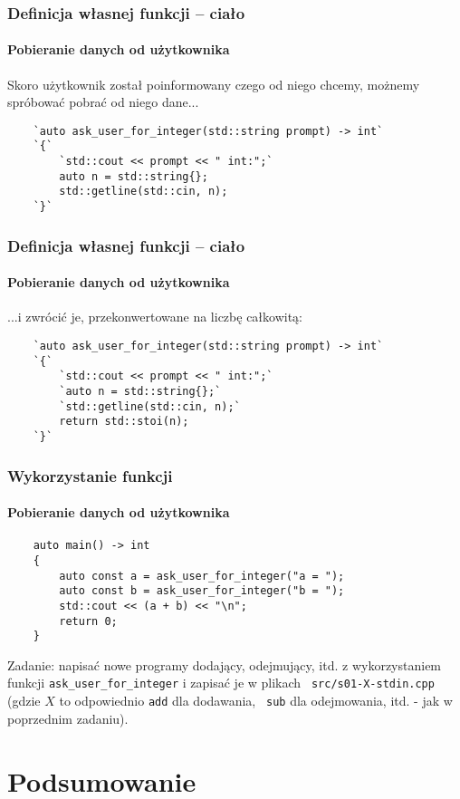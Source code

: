 \documentclass[aspectratio=169]{beamer}
\begin{document}
\begin{frame}[fragile]
    \frametitle{Definicja własnej funkcji -- ciało}
    \framesubtitle{Pobieranie danych od użytkownika}

    Skoro użytkownik został poinformowany czego od niego chcemy, możnemy
    spróbować pobrać od niego dane...

    {\scriptsize
    \begin{lstlisting}
    `auto ask_user_for_integer(std::string prompt) -> int`
    `{`
        `std::cout << prompt << " int:";`
        auto n = std::string{};
        std::getline(std::cin, n);
    `}`
    \end{lstlisting}}
\end{frame}

\begin{frame}[fragile]
    \frametitle{Definicja własnej funkcji -- ciało}
    \framesubtitle{Pobieranie danych od użytkownika}

    ...i zwrócić je, przekonwertowane na liczbę całkowitą:

    {\scriptsize
    \begin{lstlisting}
    `auto ask_user_for_integer(std::string prompt) -> int`
    `{`
        `std::cout << prompt << " int:";`
        `auto n = std::string{};`
        `std::getline(std::cin, n);`
        return std::stoi(n);
    `}`
    \end{lstlisting}}
\end{frame}

\begin{frame}[fragile]
    \frametitle{Wykorzystanie funkcji}
    \framesubtitle{Pobieranie danych od użytkownika}

    {\scriptsize
    \begin{lstlisting}
    auto main() -> int
    {
        auto const a = ask_user_for_integer("a = ");
        auto const b = ask_user_for_integer("b = ");
        std::cout << (a + b) << "\n";
        return 0;
    }
    \end{lstlisting}}

    Zadanie: napisać nowe programy dodający, odejmujący, itd. z wykorzystaniem
    funkcji {\tt ask\_user\_for\_integer} i zapisać je w plikach {\tt
    src/s01-X-stdin.cpp} (gdzie $X$ to odpowiednio {\tt add} dla dodawania, {\tt
    sub} dla odejmowania, itd. - jak w poprzednim zadaniu).
    \label{lecture_exercise_4}
\end{frame}

\section{Podsumowanie}
\end{document}
